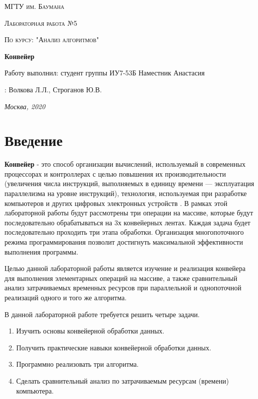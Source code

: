 \documentclass[12pt]{report}
\begin{document}
 
\begin{titlepage}
	\centering
	{\scshape\LARGE МГТУ им. Баумана \par}
	\vspace{3cm}
	{\scshape\Large Лабораторная работа №5\par}
	\vspace{0.5cm}	
	{\scshape\Large По курсу: "Анализ алгоритмов"\par}
	\vspace{1.5cm}
	{\huge\bfseries Конвейер\par}
	\vspace{2cm}
	\Large Работу выполнил: студент группы ИУ7-53Б Наместник Анастасия\par
	\vspace{0.5cm}
	:  Волкова Л.Л., Строганов Ю.В.\par

	\vfill
	\large \textit {Москва, 2020} \par
\end{titlepage}

\tableofcontents

\newpage
\chapter*{Введение}

	\textbf{Конвейер} - это способ организации вычислений, используемый в современных процессорах и контроллерах с целью повышения их производительности (увеличения числа инструкций, выполняемых в единицу времени — эксплуатация параллелизма на уровне инструкций), технология, используемая при разработке компьютеров и других цифровых электронных устройств \cite{Conveyer}.
В рамках этой лабораторной работы будут рассмотрены три операции на массиве, которые будут последовательно обрабатываться на 3х конвейерных лентах. Каждая задача
будет последовательно проходить три этапа обработки. Организация многопоточного режима программирования позволит достигнуть максимальной эффективности выполнения программы.

	Целью данной лабораторной работы является изучение и реализация конвейера для выполнения элементарных операций на массиве, а также сравнительный анализ затрачиваемых временных ресурсов при параллельной и однопоточной реализаций одного и того же алгоритма.

В данной лабораторной работе требуется решить четыре задачи.
\begin{enumerate}
\item Изучить основы конвейерной обработки данных.
\item  Получить практические навыки конвейерной обработки данных.
\item Программно реализовать три алгоритма.
\item Сделать сравнительный анализ по затрачиваемым ресурсам (времени) компьютера.
\end{enumerate}
\end{document}
